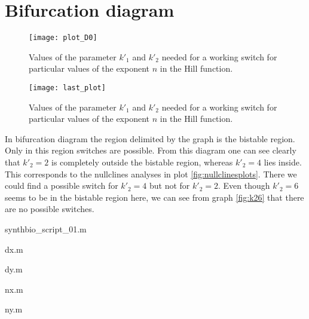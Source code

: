 \section{Bifurcation diagram}


\begin{figure}[h]
  	\centering
    \texttt{[image: plot\_D0]}
    \caption{Values of the parameter $k'_1$ and $k'_2$ needed for a working switch
 	for particular values of the exponent $n$ in the Hill function. }
 \centering
    \texttt{[image: last\_plot]}
    \caption{Values of the parameter $k'_1$ and $k'_2$ needed for a working
    switch
for particular values of the exponent $n$ in the Hill function.}
	\label{fig:bifurcatingplot}
\end{figure}

 
 
 In bifurcation diagram the region delimited by the graph is the bistable
 region. Only in this region switches are possible. From this diagram one can
 see clearly that $k'_2 = 2$ is completely outside the bistable region,
 whereas $k'_2 = 4$ lies inside. This corresponds to the nullclines analyses in
 plot \ref{fig:nullclinesplots}. There we could find a possible switch for $k'_2=4$ but not
 for $k'_2 = 2$. Even though $k'_2 = 6$ seems to be in the bistable region here,
 we can see from graph \ref{fig:k26} that there are no possible switches.

\newpage






\begin{section}{synthbio\_script\_01.m}

\end{section}
\begin{section}{dx.m}

\end{section}
\begin{section}{dy.m}

\end{section}
\begin{section}{nx.m}

\end{section}
\begin{section}{ny.m}

\end{section}
